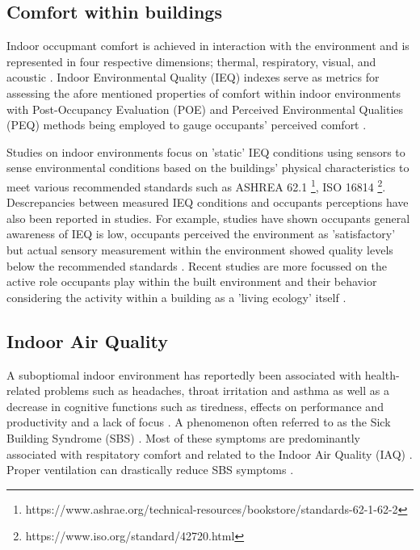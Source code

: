 \subsection{Comfort within buildings}

Indoor occupmant comfort is achieved in interaction with the environment and is represented in four respective dimensions; thermal, respiratory, visual, and acoustic \cite{alavi_comfort_2017}. Indoor Environmental Quality (IEQ) \cite{kulshreshtha_indoor_2024} indexes serve as metrics for assessing the afore mentioned properties of comfort within indoor environments with Post-Occupancy Evaluation (POE) \cite{elsayed_post-occupancy_2023} and Perceived Environmental Qualities (PEQ) \cite{son_perceived_2023} methods being employed to gauge occupants' perceived comfort \cite{boissonneault_concepts_2023}. 

Studies on indoor environments focus on 'static' IEQ conditions using sensors to sense environmental conditions based on the buildings' physical characteristics to meet various recommended standards such as ASHREA 62.1 \footnote{https://www.ashrae.org/technical-resources/bookstore/standards-62-1-62-2}, ISO 16814 \footnote{https://www.iso.org/standard/42720.html}. Descrepancies between measured IEQ conditions and occupants perceptions have also been reported in studies. For example, studies have shown occupants general awareness of IEQ is low, occupants perceived the environment as 'satisfactory' but actual sensory measurement within the environment showed quality levels below the recommended standards \cite{son_perceived_2023}. Recent studies are more focussed on the active role occupants play within the built environment and their behavior considering the activity within a building as a 'living ecology' itself \cite{langevin_quantifying_2016}. 


\subsection{Indoor Air Quality}

A suboptiomal indoor environment has reportedly been associated with health-related problems such as headaches, throat irritation and asthma \cite{klepeis_national_2001} as well as a decrease in cognitive functions such as tiredness, effects on performance and productivity and a lack of focus \cite{wang_how_2021} \cite{du_indoor_2020}. A phenomenon often referred to as the Sick Building Syndrome (SBS) \cite{gawande_indoor_2020, passarelli_sick_2009}. Most of these symptoms are predominantly associated with respitatory comfort and related to the Indoor Air Quality (IAQ) \cite{kim_analyzing_2019}. Proper ventilation can drastically reduce SBS symptoms \cite{gawande_indoor_2020}.

